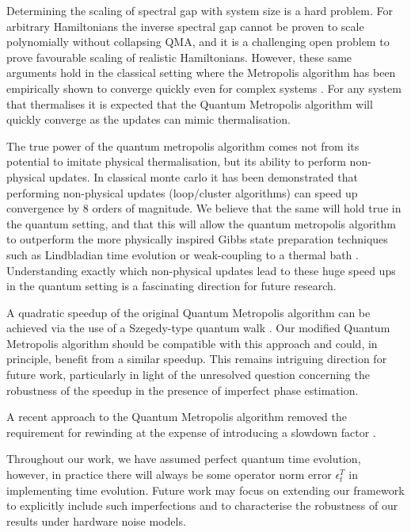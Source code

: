 \documentclass[aps,floatfix,10pt,amssymb,amsfont,amsmath,superscriptaddress,float,nofootinbib,longbibliography,nobalancelastpage,twocolumn]{revtex4-2}
\begin{document}
Determining the scaling of spectral gap with system size is a hard problem. For arbitrary Hamiltonians the inverse spectral gap cannot be proven to scale polynomially without collapsing QMA, and it is a challenging open problem to prove favourable scaling of realistic Hamiltonians. However, these same arguments hold in the classical setting where the Metropolis algorithm has been empirically shown to converge quickly even for complex systems \cite{}.  For any system that thermalises it is expected that the Quantum Metropolis algorithm will quickly converge as the updates can mimic thermalisation.

The true power of the quantum metropolis algorithm comes not from its potential to imitate physical thermalisation, but its ability to perform non-physical updates. In classical monte carlo it has been demonstrated \cite{todo2019parallel} that performing non-physical updates (loop/cluster algorithms) can speed up convergence by 8 orders of magnitude. We believe that the same will hold true in the quantum setting, and that this will allow the quantum metropolis algorithm to outperform the more physically inspired Gibbs state preparation techniques such as Lindbladian time evolution \cite{chen2023quantumthermalstatepreparation,rall2023thermal} or weak-coupling to a thermal bath \cite{chen2021fast,shtanko2021preparing}. Understanding exactly which non-physical updates lead to these huge speed ups in the quantum setting is a fascinating direction for future research.


A quadratic speedup \cite{} of the original Quantum Metropolis algorithm can be achieved via the use of a Szegedy-type quantum walk \cite{}. Our modified Quantum Metropolis algorithm should be compatible with this approach and could, in principle, benefit from a similar speedup. This remains intriguing direction for future work, particularly in light of the unresolved question concerning the robustness of the speedup in the presence of imperfect phase estimation. 

A recent approach to the Quantum Metropolis algorithm removed the requirement for rewinding at the expense of introducing a slowdown factor \cite{}.  

Throughout our work, we have assumed perfect quantum time evolution, however, in practice there will always be some operator norm error $\epsilon^T_t$ in implementing time evolution. Future work may focus on extending our framework to explicitly include such imperfections and to characterise the robustness of our results under hardware noise models.
\end{document}
